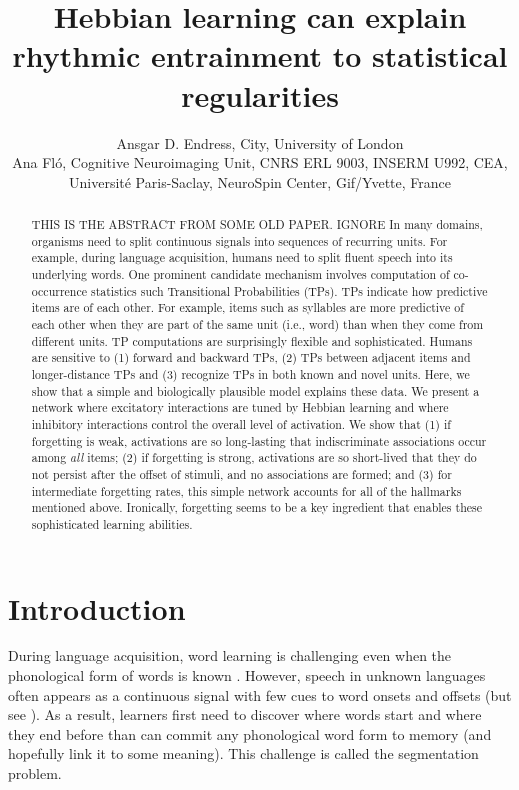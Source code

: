 \documentclass[
]{article}
\title{Hebbian learning can explain rhythmic entrainment to statistical
regularities}
\author{Ansgar D. Endress, City, University of London\\
Ana Fló, Cognitive Neuroimaging Unit, CNRS ERL 9003, INSERM U992, CEA,
Université Paris-Saclay, NeuroSpin Center, Gif/Yvette, France}
\date{}
\begin{document}
\maketitle
\begin{abstract}
THIS IS THE ABSTRACT FROM SOME OLD PAPER. IGNORE In many domains,
organisms need to split continuous signals into sequences of recurring
units. For example, during language acquisition, humans need to split
fluent speech into its underlying words. One prominent candidate
mechanism involves computation of co-occurrence statistics such
Transitional Probabilities (TPs). TPs indicate how predictive items are
of each other. For example, items such as syllables are more predictive
of each other when they are part of the same unit (i.e., word) than when
they come from different units. TP computations are surprisingly
flexible and sophisticated. Humans are sensitive to (1) forward and
backward TPs, (2) TPs between adjacent items and longer-distance TPs and
(3) recognize TPs in both known and novel units. Here, we show that a
simple and biologically plausible model explains these data. We present
a network where excitatory interactions are tuned by Hebbian learning
and where inhibitory interactions control the overall level of
activation. We show that (1) if forgetting is weak, activations are so
long-lasting that indiscriminate associations occur among \emph{all}
items; (2) if forgetting is strong, activations are so short-lived that
they do not persist after the offset of stimuli, and no associations are
formed; and (3) for intermediate forgetting rates, this simple network
accounts for all of the hallmarks mentioned above. Ironically,
forgetting seems to be a key ingredient that enables these sophisticated
learning abilities.
\end{abstract}

\hypertarget{introduction}{%
\section{Introduction}\label{introduction}}

During language acquisition, word learning is challenging even when the
phonological form of words is known \citep{Gillette1999, Medina2011}.
However, speech in unknown languages often appears as a continuous
signal with few cues to word onsets and offsets (but see
\citep{Brentari2011, Christophe2001, Endress-cross-seg, Johnson2001a, Johnson2009, Pilon1981, Shukla2007, Shukla2011}).
As a result, learners first need to discover where words start and where
they end before than can commit any phonological word form to memory
\citep{Aslin1998, Saffran-Science, Saffran1996b} (and hopefully link it
to some meaning). This challenge is called the segmentation problem.
\end{document}
